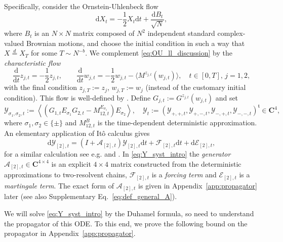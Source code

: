 \documentclass[10pt]{amsart}
\numberwithin{equation}{section}
\newcommand{\dif}{\mathrm{d}}
\newcommand{\C}{\mathbf{C}}
\newcommand{\mt}{\mathfrak{t}}
\begin{document}
Specifically, consider the Ornstein-Uhlenbeck flow
\begin{equation}
\dif X_t = -\frac{1}{2}X_t\dif t + \frac{\dif B_t}{\sqrt{N}},
\label{eq:OU_ll_discussion}
\end{equation}
where $B_t$ is an $N\times N$ matrix composed of $N^2$ independent standard complex-valued Brownian motions, and choose the initial condition in such a way that $X\stackrel{d}{=}X_T$ for some $T\sim N^{-b}$. We complement \eqref{eq:OU_ll_discussion} by the \emph{characteristic flow}
\begin{equation}
\frac{\dif}{\dif t} z_{j,t}=-\frac{1}{2} z_{j,t},\qquad\frac{\dif}{\dif t} w_{j,t} = -\frac{1}{2}w_{j,t} - \langle M^{z_{j,t}}(w_{j,t})\rangle,\quad t\in [0,T],\, j=1,2,
\label{eq:char_flow_discussion}
\end{equation} 
with the final condition $z_{j,T}:=z_j$, $w_{j,T}:=w_j$ (instead of the customary initial condition). This flow is well-defined by \cite[Lemma~5.2]{Cipolloni_meso}. Define $G_{j,t}:=G^{z_{j,t}}(w_{j,t})$ and set
\begin{equation}
\mathcal{Y}_{\sigma_1,\sigma_2,t}:=\left\langle \left(G_{1,t}E_{\sigma_1}G_{2,t}-M_{12,t}^{E_{\sigma_1}}\right)E_{\sigma_2}\right\rangle,\quad \mathcal{Y}_t:=\left(\mathcal{Y}_{+,+,t},\mathcal{Y}_{+,-,t},\mathcal{Y}_{-,+,t},\mathcal{Y}_{-,-,t}\right)^\mt\in\C^4, 
\end{equation}
where $\sigma_1,\sigma_2\in\{\pm\}$ and $M_{12,t}^B$ is the time-dependent deterministic approximation. An elementary application of It\^{o} calculus gives
\begin{equation}
\dif \mathcal{Y}_{[2],t} = \left(I+\mathcal{A}_{[2],t}\right)\mathcal{Y}_{[2],t}\dif t +\mathcal{F}_{[2],t}\dif t+\dif\mathcal{E}_{[2],t},
\label{eq:Y_syst_intro}
\end{equation}
for a similar calculation see e.g. \cite[Eq.(5.42)--(5.47)]{univ_extr} and \cite[Eq.(4.67)--(4.69)]{nonHermdecay}. In \eqref{eq:Y_syst_intro} the \emph{generator} $\mathcal{A}_{[2],t}\in\C^{4\times 4}$ is an explicit $4\times 4$ matrix constructed from the deterministic approximations to two-resolvent chains, $\mathcal{F}_{[2],t}$ is a \emph{forcing term} and $\mathcal{E}_{[2],t}$ is a \emph{martingale term}. The exact form of $\mathcal{A}_{[2],t}$ is given in Appendix~\ref{app:propagator} later (see also Supplementary Eq.~\eqref{eq:def_general_A}). 

We will solve \eqref{eq:Y_syst_intro} by the Duhamel formula, so need to understand the propagator of this ODE. To this end, we prove the following bound on the propagator in Appendix~\ref{app:propagator}. 
\end{document}

